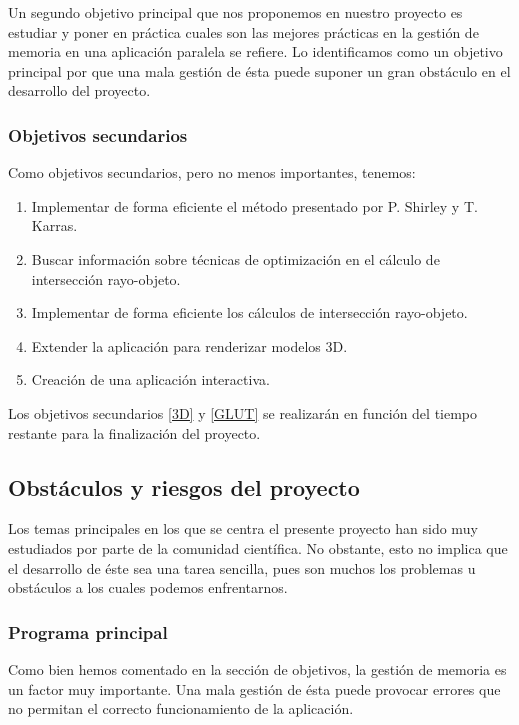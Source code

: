\documentclass[titlepage,12pt]{report}
\begin{document}
Un segundo objetivo principal que nos proponemos en nuestro proyecto es estudiar y poner en práctica cuales son las mejores prácticas en la gestión de memoria en una aplicación paralela se refiere. Lo identificamos como un objetivo principal por que una mala gestión de ésta puede suponer un gran obstáculo en el desarrollo del proyecto.

\subsubsection{Objetivos secundarios}

Como objetivos secundarios, pero no menos importantes, tenemos:

\begin{enumerate}
	\item Implementar de forma eficiente el método presentado por P. Shirley y T. Karras.
	\item Buscar información sobre técnicas de optimización en el cálculo de intersección rayo-objeto.
	\item Implementar de forma eficiente los cálculos de intersección rayo-objeto.
	\item \label{3D} Extender la aplicación para renderizar modelos 3D.
	\item \label{GLUT} Creación de una aplicación interactiva.
\end{enumerate}

Los objetivos secundarios \ref{3D} y \ref{GLUT} se realizarán en función del tiempo restante para la finalización del proyecto.

\subsection{Obstáculos y riesgos del proyecto}

Los temas principales en los que se centra el presente proyecto han sido muy estudiados por parte de la comunidad científica. No obstante, esto no implica que el desarrollo de éste sea una tarea sencilla, pues son muchos los problemas u obstáculos a los cuales podemos enfrentarnos.

\subsubsection{Programa principal}

Como bien hemos comentado en la sección de objetivos, la gestión de memoria es un factor muy importante. Una mala gestión de ésta puede provocar errores que no permitan el correcto funcionamiento de la aplicación.
\end{document}

